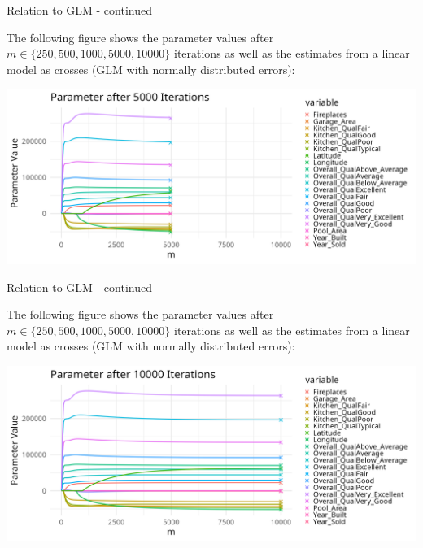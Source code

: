 \begin{vbframe}{Relation to GLM - continued}

The following figure shows the parameter values after $m \in \{250, 500, 1000, 5000, 10000\}$ iterations as well as the estimates from a linear model as crosses (GLM with normally distributed errors):

\begin{center}
\includegraphics[width=\textwidth]{figure/compboost-to-glm-iter5000.png}
\end{center}

\end{vbframe}

\begin{vbframe}{Relation to GLM - continued}

The following figure shows the parameter values after $m \in \{250, 500, 1000, 5000, 10000\}$ iterations as well as the estimates from a linear model as crosses (GLM with normally distributed errors):

\begin{center}
\includegraphics[width=\textwidth]{figure/compboost-to-glm-iter10000.png}
\end{center}

\end{vbframe}



